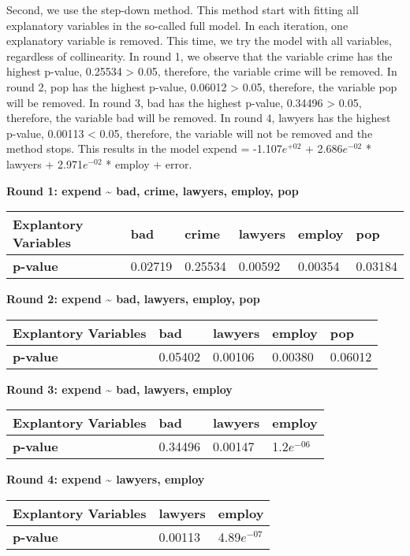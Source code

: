\documentclass[]{article}
\begin{document}
Second, we use the step-down method. This method start with fitting all
explanatory variables in the so-called full model. In each iteration,
one explanatory variable is removed. This time, we try the model with
all variables, regardless of collinearity. In round 1, we observe that
the variable crime has the highest p-value, 0.25534 \textgreater{} 0.05,
therefore, the variable crime will be removed. In round 2, pop has the
highest p-value, 0.06012 \textgreater{} 0.05, therefore, the variable
pop will be removed. In round 3, bad has the highest p-value, 0.34496
\textgreater{} 0.05, therefore, the variable bad will be removed. In
round 4, lawyers has the highest p-value, 0.00113 \textless{} 0.05,
therefore, the variable will not be removed and the method stops. This
results in the model expend = -1.107\(e^{+02}\) + 2.686\(e^{-02}\) *
lawyers + 2.971\(e^{-02}\) * employ + error.

\textbf{Round 1: expend \textasciitilde{} bad, crime, lawyers, employ,
pop}

\begin{longtable}[]{@{}llllll@{}}
\toprule
\textbf{Explantory Variables} & bad & crime & lawyers & employ &
pop\tabularnewline
\midrule
\endhead
\textbf{p-value} & 0.02719 & 0.25534 & 0.00592 & 0.00354 &
0.03184\tabularnewline
\bottomrule
\end{longtable}

\textbf{Round 2: expend \textasciitilde{} bad, lawyers, employ, pop}

\begin{longtable}[]{@{}lllll@{}}
\toprule
\textbf{Explantory Variables} & bad & lawyers & employ &
pop\tabularnewline
\midrule
\endhead
\textbf{p-value} & 0.05402 & 0.00106 & 0.00380 & 0.06012\tabularnewline
\bottomrule
\end{longtable}

\textbf{Round 3: expend \textasciitilde{} bad, lawyers, employ}

\begin{longtable}[]{@{}llll@{}}
\toprule
\textbf{Explantory Variables} & bad & lawyers & employ\tabularnewline
\midrule
\endhead
\textbf{p-value} & 0.34496 & 0.00147 & 1.2\(e^{-06}\)\tabularnewline
\bottomrule
\end{longtable}

\textbf{Round 4: expend \textasciitilde{} lawyers, employ}

\begin{longtable}[]{@{}lll@{}}
\toprule
\textbf{Explantory Variables} & lawyers & employ\tabularnewline
\midrule
\endhead
\textbf{p-value} & 0.00113 & 4.89\(e^{-07}\)\tabularnewline
\bottomrule
\end{longtable}
\end{document}
